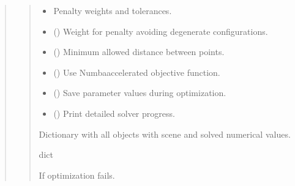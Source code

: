 \documentclass[letterpaper,10pt,english]{sphinxmanual}
\begin{document}
\begin{quote}
\begin{fulllineitems}
\begin{fulllineitems}
\begin{quote}
\begin{description}
\begin{itemize}
\item {} 
\sphinxAtStartPar
{} \textendash{} Penalty weights and tolerances.

\item {} 
\sphinxAtStartPar
{} () \textendash{} Weight for penalty avoiding degenerate configurations.

\item {} 
\sphinxAtStartPar
{} (\sphinxstyleliteralemphasis{\sphinxupquote{ | }}) \textendash{} Minimum allowed distance between points.

\item {} 
\sphinxAtStartPar
{} () \textendash{} Use Numba\sphinxhyphen{}accelerated objective function.

\item {} 
\sphinxAtStartPar
{} () \textendash{} Save parameter values during optimization.

\item {} 
\sphinxAtStartPar
{} () \textendash{} Print detailed solver progress.

\end{itemize}

\sphinxAtStartPar
Dictionary with all objects with scene and solved numerical values.

\sphinxAtStartPar
dict

\sphinxAtStartPar
{} \textendash{} If optimization fails.

\end{description}\end{quote}

\end{fulllineitems}



\end{fulllineitems}
\end{quote}
\end{document}
